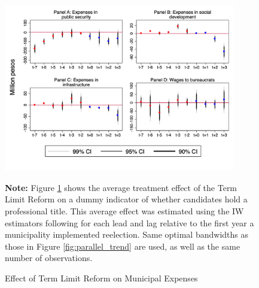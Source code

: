 \documentclass[12pt]{amsart}
\numberwithin{equation}{section}
\theoremstyle{definition}
\theoremstyle{definition}
\theoremstyle{definition}
\begin{document}
 \begin{figure}[h]   
\centering
 \caption{Effect of Term Limit Reform on Municipal Expenses}
 \label{fig:expenses}
\includegraphics[width=0.9\textwidth]{../Figures/expenses_allyears.png}
       \captionsetup{justification=centering}
         
 \textbf{Note:} Figure \ref{fig:expenses} shows the average treatment effect of the Term Limit Reform on a dummy indicator of whether candidates hold a professional title. This average effect was estimated using the IW estimators following \citet{abraham_sun_2020} for each lead and lag relative to the first year a municipality implemented reelection. Same optimal bandwidths as those in Figure \ref{fig:parallel_trend} are used, as well as the same number of observations.  
     
\end{figure}    
  
\end{document}
